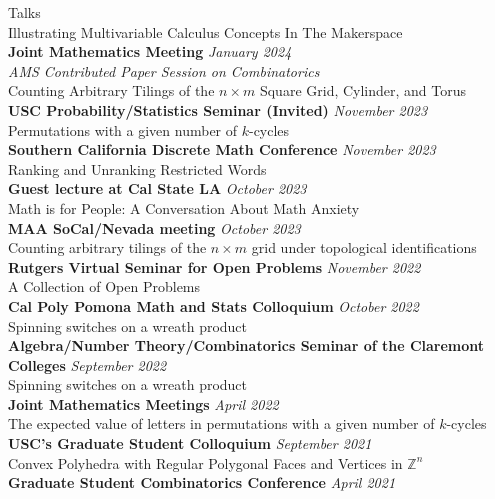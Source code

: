 \documentclass{cv} %
\begin{document}
\begin{rSection}{Talks}
  \\ Illustrating Multivariable Calculus Concepts In The Makerspace
  \\
  \textbf{Joint Mathematics Meeting} \hfill \textit{January 2024} \\
  \textit{AMS Contributed Paper Session on Combinatorics} \\
  Counting Arbitrary Tilings of the $n \times m$ Square Grid, Cylinder, and Torus
  \\
  \textbf{USC Probability/Statistics Seminar (Invited)} \hfill \textit{November 2023} \\
  Permutations with a given number of $k$-cycles
  \\
  \textbf{Southern California Discrete Math Conference} \hfill \textit{November 2023} \\
  Ranking and Unranking Restricted Words
  \\
  \textbf{Guest lecture at Cal State LA} \hfill \textit{October 2023}\\
  Math is for People: A Conversation About Math Anxiety
  \\
  \textbf{MAA SoCal/Nevada meeting} \hfill \textit{October 2023} \\
  Counting arbitrary tilings of the $n \times m$ grid under topological identifications
  \\
  \textbf{Rutgers Virtual Seminar for Open Problems} \hfill \textit{November 2022} \\
  A Collection of Open Problems
  \\
  \textbf{Cal Poly Pomona Math and Stats Colloquium} \hfill \textit{October 2022} \\
  Spinning switches on a wreath product
  \\
  \textbf{Algebra/Number Theory/Combinatorics Seminar of the Claremont Colleges} \hfill \textit{September 2022} \\
  Spinning switches on a wreath product
  \\
  \textbf{Joint Mathematics Meetings} \hfill \textit{April 2022} \\
  The expected value of letters in permutations with a given number of $k$-cycles
  \\
  \textbf{USC's Graduate Student Colloquium} \hfill \textit{September 2021} \\
  Convex Polyhedra with Regular Polygonal Faces and Vertices in $\mathbb Z^n$
  \\
  \textbf{Graduate Student Combinatorics Conference} \hfill \textit{April 2021} \\

\end{rSection}
\end{document}
